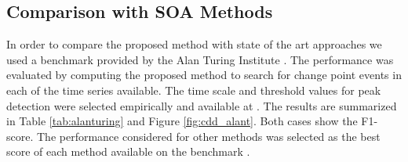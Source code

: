 \subsection{Comparison with SOA Methods}

In order to compare the proposed method with state of the art approaches we used a benchmark provided by the Alan Turing Institute \cite{cpd_alan}. The performance was evaluated by computing the proposed method to search for change point events in each of the time series available. The time scale and threshold values for peak detection were selected empirically and available at \cite{}. The results are summarized in Table \ref{tab:alanturing} and Figure \ref{fig:cdd_alant}. Both cases show the F1-score. The performance considered for other methods was selected as the best score of each method available on the benchmark \cite{cpd_alan}.

